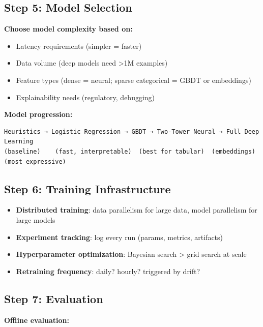 \documentclass[11pt]{article}
\providecommand{\tightlist}{\setlength{\itemsep}{1pt}\setlength{\parskip}{0pt}}
\begin{document}
\subsection{Step 5: Model Selection}\label{step-5-model-selection}

\textbf{Choose model complexity based on:}

\begin{itemize}
\tightlist
\item
  Latency requirements (simpler = faster)
\item
  Data volume (deep models need \textgreater1M examples)
\item
  Feature types (dense = neural; sparse categorical = GBDT or embeddings)
\item
  Explainability needs (regulatory, debugging)
\end{itemize}

\textbf{Model progression:}

\setcodelang{}

\begin{verbatim}
Heuristics → Logistic Regression → GBDT → Two-Tower Neural → Full Deep Learning
(baseline)    (fast, interpretable)  (best for tabular)  (embeddings)    (most expressive)
\end{verbatim}

\subsection{Step 6: Training Infrastructure}\label{step-6-training-infrastructure}

\begin{itemize}
\tightlist
\item
  \textbf{Distributed training}: data parallelism for large data, model parallelism for large models
\item
  \textbf{Experiment tracking}: log every run (params, metrics, artifacts)
\item
  \textbf{Hyperparameter optimization}: Bayesian search \textgreater{} grid search at scale
\item
  \textbf{Retraining frequency}: daily? hourly? triggered by drift?
\end{itemize}

\subsection{Step 7: Evaluation}\label{step-7-evaluation}

\textbf{Offline evaluation:}
\end{document}
